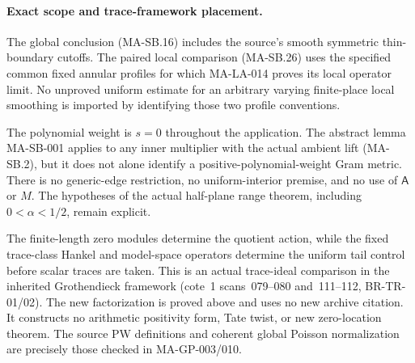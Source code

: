 \paragraph{Exact scope and trace-framework placement.}
The global conclusion (MA-SB.16) includes the source's
smooth symmetric thin-boundary cutoffs.
The paired local comparison (MA-SB.26) uses the
specified common fixed annular profiles for which
MA-LA-014 proves its local operator limit.
No unproved uniform estimate for an arbitrary
varying finite-place local smoothing is imported
by identifying those two profile conventions.

The polynomial weight is $s=0$ throughout the
application.  The abstract lemma MA-SB-001 applies
to any inner multiplier with the actual ambient
lift (MA-SB.2), but it does not alone identify a
positive-polynomial-weight Gram metric.
There is no generic-edge restriction, no
uniform-interior premise, and no use of
$\mathsf A$ or $M$.
The hypotheses of the actual half-plane range
theorem, including $0<\alpha<1/2$, remain explicit.

The finite-length zero modules determine the
quotient action, while the fixed trace-class
Hankel and model-space operators determine the
uniform tail control before scalar traces are
taken.  This is an actual trace-ideal comparison
in the inherited Grothendieck framework
(cote~1 scans~079--080 and~111--112,
BR-TR-01/02).  The new factorization is proved
above and uses no new archive citation.
It constructs no arithmetic positivity form,
Tate twist, or new zero-location theorem.
The source PW definitions and coherent global
Poisson normalization are precisely those
checked in MA-GP-003/010.
